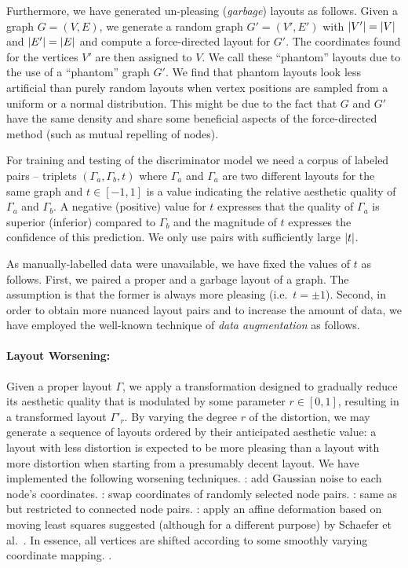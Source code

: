 Furthermore, we have generated  un-pleasing (\emph{garbage}) layouts as follows.  Given a graph
$G=(V,E)$, we generate a random graph $G'=(V',E')$ with $\left\lvert V'\right\rvert=\left\lvert V\right\rvert$ and $\left\lvert E'\right\rvert=\left\lvert E\right\rvert$ and compute a
force-directed layout for $G'$.  The coordinates found for the vertices $V'$ are then assigned to $V$.  We call these
\enquote{phantom} layouts due to the use of a \enquote{phantom} graph $G'$.  We find that phantom layouts look less
artificial than purely random layouts when vertex positions are sampled from a uniform or a normal distribution.  This
might be due to the fact that $G$ and $G'$ have the same density and share some beneficial aspects of the force-directed
method (such as mutual repelling of nodes).  

For training and testing of the discriminator model we need a corpus of labeled pairs -- triplets
$(\Gamma_a,\Gamma_b,t)$ where $\Gamma_a$ and $\Gamma_a$ are two different layouts for the same graph and $t\in [-1,1]$
is a value indicating the relative aesthetic quality of $\Gamma_a$ and $\Gamma_b$.  A negative (positive) value for $t$
expresses that the quality of $\Gamma_a$ is superior (inferior) compared to $\Gamma_b$ and the magnitude of $t$
expresses the confidence of this prediction.  We only use pairs with sufficiently large $\left\lvert t\right\rvert$.

As manually-labelled data were unavailable, we have fixed the values of $t$ as follows.  First, we paired a proper and a
garbage layout of a graph.  The assumption is that the former is always more pleasing (i.e.~$t=\pm1$).  Second, in order
to obtain more nuanced layout pairs and to increase the amount of data, we have employed the well-known technique of
\emph{data augmentation} as follows.

\paragraph{Layout Worsening:}
Given a proper layout $\Gamma$, we apply a transformation designed to gradually reduce its aesthetic quality that is
modulated by some parameter $r\in[0,1]$, resulting in a transformed layout $\Gamma'_r$.  By varying the degree $r$ of
the distortion, we may generate a sequence of layouts ordered by their anticipated aesthetic value: a layout with less
distortion is expected to be more pleasing than a layout with more distortion when starting from a presumably decent
layout.  We have implemented the following worsening techniques.  : add Gaussian noise to each node's
coordinates.  : swap coordinates of randomly selected node pairs.  : same as
 but restricted to connected node pairs.  : apply an affine deformation based on moving
least squares suggested (although for a different purpose) by Schaefer et al.~\cite{Schaefer2006}.  In essence, all
vertices are shifted according to some smoothly varying coordinate mapping.  .

